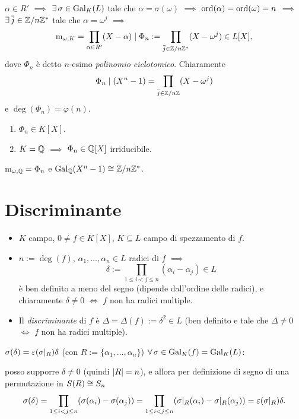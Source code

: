 $\alpha\in R'$ $\implies$ $\exi\sigma\in\Gal[K]{L}$ tale che $\alpha=\sigma(\omega)$ $\implies$ $\ord(\alpha)=\ord(\omega)=n$ $\implies$ $\exi\cl{j}\in\Z/n\Z^*$ tale che $\alpha=\omega^j$ $\implies$
\[
\polmin_{\omega,K}=\prod_{\alpha\in R'}(X-\alpha)\dvd\Phi_n:=\prod_{\cl{j}\in\Z/n\Z^*}(X-\omega^j)\in L[X],
\]
dove $\Phi_n$ è detto $n$-esimo {\em polinomio ciclotomico}. Chiaramente
\[
\Phi_n\dvd(X^n-1)=\prod_{\cl{j}\in\Z/n\Z}(X-\omega^j)
\]
e $\deg(\Phi_n)=\varphi(n)$. 
\begin{teor}
\begin{enumerate}
\item $\Phi_n\in K[X]$.
\item $K=\Q$ $\implies$ $\Phi_n\in\Q[X]$ irriducibile.
\end{enumerate}
\end{teor}
\begin{coro}
$\polmin_{\omega,\Q}=\Phi_n$ e $\Gal[\Q]{X^n-1}\iso\Z/n\Z^*$.
\end{coro}



\section{Discriminante}

\begin{itemize}
\item $K$ campo, $0\ne f\in K[X]$, $K\subseteq L$ campo di spezzamento di $f$.
\item $n:=\deg(f)$, $\alpha_1,\dots,\alpha_n\in L$ radici di $f$ $\implies$
\[
\delta:=\prod_{1\le i<j\le n}(\alpha_i-\alpha_j)\in L
\]
è ben definito a meno del segno (dipende dall'ordine delle radici), e chiaramente $\delta\ne0$ $\iff$ $f$ non ha radici multiple.
\item Il {\em discriminante} di $f$ è $\Delta=\Delta(f):=\delta^2\in L$ (ben definito e tale che $\Delta\ne0$ $\iff$ $f$ non ha radici multiple).
\end{itemize}
\begin{osse}
$\sigma(\delta)=\varepsilon(\sigma\rest{R})\delta$ (con $R:=\{\alpha_1,\dots,\alpha_n\}$) $\all\sigma\in\Gal[K]{f}=\Gal[K]{L}$:

posso supporre $\delta\ne0$ (quindi $\card{R}=n$), e allora per definizione di segno di una permutazione in $S(R)\iso S_n$
\[
\sigma(\delta)=\prod_{1\le i<j\le n}(\sigma(\alpha_i)-\sigma(\alpha_j))=\prod_{1\le i<j\le n}(\sigma\rest{R}(\alpha_i)-\sigma\rest{R}(\alpha_j))=\varepsilon(\sigma\rest{R})\delta.
\]
\end{osse}



